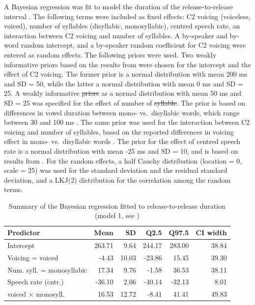 \documentclass[12pt,a4paper,]{article}
\providecommand{\DIFaddtex}[1]{{\protect\color{blue}\uwave{#1}}} %
\providecommand{\DIFdeltex}[1]{{\protect\color{red}\sout{#1}}}                      %
\providecommand{\DIFaddbegin}{} %
\providecommand{\DIFaddend}{} %
\providecommand{\DIFdelbegin}{} %
\providecommand{\DIFdelend}{} %
\providecommand{\DIFadd}[1]{\texorpdfstring{\DIFaddtex{#1}}{#1}} %
\providecommand{\DIFdel}[1]{\texorpdfstring{\DIFdeltex{#1}}{}} %
\newcommand{\DIFscaledelfig}{0.5}
\newlength{\DIFdelgraphicswidth} %
\newlength{\DIFdelgraphicsheight} %
\newcommand{\DIFaddincludegraphics}[2][]{{\color{blue}\fbox{\DIFOincludegraphics[#1]{#2}}}} %
\newcommand{\DIFdelincludegraphics}[2][]{%
\sbox{\DIFdelgraphicsbox}{\DIFOincludegraphics[#1]{#2}}%
\settoboxwidth{\DIFdelgraphicswidth}{\DIFdelgraphicsbox} %
\settoboxtotalheight{\DIFdelgraphicsheight}{\DIFdelgraphicsbox} %
\scalebox{\DIFscaledelfig}{%
\parbox[b]{\DIFdelgraphicswidth}{\usebox{\DIFdelgraphicsbox}\\[-\baselineskip] \rule{\DIFdelgraphicswidth}{0em}}\llap{\resizebox{\DIFdelgraphicswidth}{\DIFdelgraphicsheight}{%
\setlength{\unitlength}{\DIFdelgraphicswidth}%
\begin{picture}(1,1)%
\thicklines\linethickness{2pt} %
{\color[rgb]{1,0,0}\put(0,0){\framebox(1,1){}}}%
{\color[rgb]{1,0,0}\put(0,0){\line( 1,1){1}}}%
{\color[rgb]{1,0,0}\put(0,1){\line(1,-1){1}}}%
\end{picture}%
}\hspace*{3pt}}} %
} %
\DeclareRobustCommand{\DIFaddbegin}{\DIFOaddbegin \let\includegraphics\DIFaddincludegraphics} %
\DeclareRobustCommand{\DIFaddend}{\DIFOaddend \let\includegraphics\DIFOincludegraphics} %
\DeclareRobustCommand{\DIFdelbegin}{\DIFOdelbegin \let\includegraphics\DIFdelincludegraphics} %
\DeclareRobustCommand{\DIFdelend}{\DIFOaddend \let\includegraphics\DIFOincludegraphics} %
\begin{document}
\label{s:rr}

A Bayesian regression was fit to model the duration of the
release-to-release interval \DIFaddbegin \DIFadd{(model 1)}\DIFaddend . The following terms were included
as fixed effects: C2 voicing (voiceless, voiced), number of syllables
(disyllabic, monosyllabic), centred speech rate, an interaction between
C2 voicing and number of syllables. A by-speaker and by-word random
intercept, and a by-speaker random coefficient for C2 voicing were
entered as random effects. The following priors were used. Two weakly
informative priors based on the results from \citet{coretta2018j} were
chosen for the intercept and the effect of C2 voicing. The former prior
is a normal distribution with mean 200 ms and SD = 50, while the latter
a normal distribution with mean 0 ms and SD = 25. A weakly informative
\DIFdelbegin \DIFdel{priors }\DIFdelend \DIFaddbegin \DIFadd{prior }\DIFaddend as a normal distribution with mean 50 ms and SD = 25 was specified
for the effect of number of \DIFdelbegin \DIFdel{syllable}\DIFdelend \DIFaddbegin \DIFadd{syllables}\DIFaddend . The prior is based on differences
in vowel duration between mono- vs.~disyllabic words, which range
between 30 and 100 ms \citep{sharf1962, klatt1973}. The same prior was
used for the interaction between C2 voicing and number of syllables,
based on the reported differences in voicing effect in mono-
vs.~disyllabic words \citep{sharf1962, klatt1973}. The prior for the
effect of centred speech rate is a normal distribution with mean -25 ms
and SD = 10, and is based on results from \citet{coretta2018j}. For the
random effects, a half Cauchy distribution (location = 0, scale = 25)
was used for the standard deviation and the residual standard deviation,
and a LKJ(2) distribution for the correlation among the random terms.

\begin{table}[t]

\caption{\label{tab:rr-1-table}Summary of the Bayesian regression fitted to release-to-release duration (model 1, see )}
\centering
\fontsize{8}{10}\selectfont
\begin{tabular}{lrrrrr}
\toprule
Predictor & Mean & SD & Q2.5 & Q97.5 & CI width\\
\midrule
Intercept & 263.71 & 9.64 & 244.17 & 283.00 & 38.84\\
Voicing = voiced & -4.43 & 10.03 & -23.86 & 15.45 & 39.30\\
Num. syll. = monosyllabic & 17.34 & 9.76 & -1.58 & 36.53 & 38.11\\
Speech rate (cntr.) & -36.10 & 2.06 & -40.14 & -32.13 & 8.01\\
voiced × monosyll. & 16.53 & 12.72 & -8.41 & 41.41 & 49.83\\
\bottomrule
\end{tabular}
\end{table}
\end{document}
